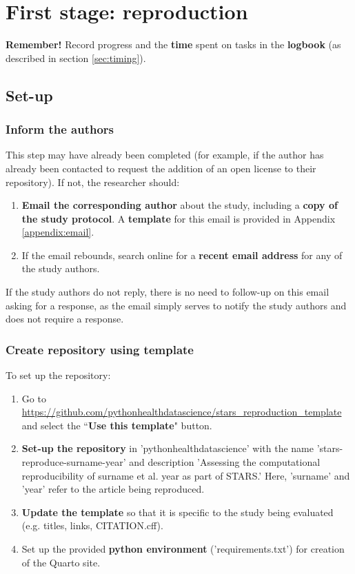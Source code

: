 \section{First stage: reproduction} \label{sec:reproduce}

\textbf{Remember!} Record progress and the \textbf{time} spent on tasks in the \textbf{logbook} (as described in section \ref{sec:timing}).

\vspace{0.5cm}
\subsection{Set-up}

\subsubsection{Inform the authors}

This step may have already been completed  (for example, if the author has already been contacted to request the addition of an open license to their repository). If not, the researcher should:
\begin{enumerate}
    \item \textbf{Email the corresponding author} about the study, including a \textbf{copy of the study protocol}. A \textbf{template} for this email is provided in Appendix \ref{appendix:email}.
    \item If the email rebounds, search online for a \textbf{recent email address} for any of the study authors.
\end{enumerate}

If the study authors do not reply, there is no need to follow-up on this email asking for a response, as the email simply serves to notify the study authors and does not require a response.

\vspace{0.5cm}
\subsubsection{Create repository using template}

To set up the repository:

\begin{enumerate}
    \item Go to \url{https://github.com/pythonhealthdatascience/stars_reproduction_template} and select the ``\textbf{Use this template}" button.
    \item \textbf{Set-up the repository} in 'pythonhealthdatascience' with the name 'stars-reproduce-surname-year' and description 'Assessing the computational reproducibility of surname et al. year as part of STARS.' Here, 'surname' and 'year' refer to the article being reproduced.
    \item \textbf{Update the template} so that it is specific to the study being evaluated (e.g. titles, links, CITATION.cff).
    \item Set up the provided \textbf{python environment} ('requirements.txt') for creation of the Quarto site.
\end{enumerate}

